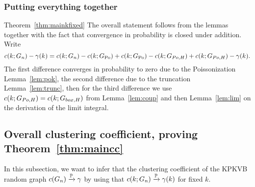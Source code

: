 \subsubsection{Putting everything together}
\begin{proofof}{Theorem~\ref{thm:mainkfixed}}
The overall statement follows from the lemmas together with the fact that convergence in probability is closed under addition.
Write 
$$c(k;G_n)-\gamma(k) = c(k;G_n) - c(k;G_{\text{Po}})+c(k;G_{\text{Po}})-c(k;G_{Po,H})+c(k;G_{Po,H})-\gamma(k).$$ 
The first difference converges in probability to zero due to the Poissonization Lemma~\ref{lem:pok}, the second difference due to the truncation Lemma~\ref{lem:trunc}, then for the third difference we use $c(k;G_{Po,H})=c(k;G_{box,H})$ from Lemma~\ref{lem:coup} and then Lemma~\ref{lem:lim} on the derivation of the limit integral.
\end{proofof}

\subsection{Overall clustering coefficient, proving Theorem~\ref{thm:maincc}}
In this subsection, we want to infer that the clustering coefficient of the KPKVB random graph $c(G_n) \xrightarrow{\mathbb{P}} \gamma$ by using that $c(k;G_n) \xrightarrow{\mathbb{P}} \gamma(k)$ for fixed $k$.

